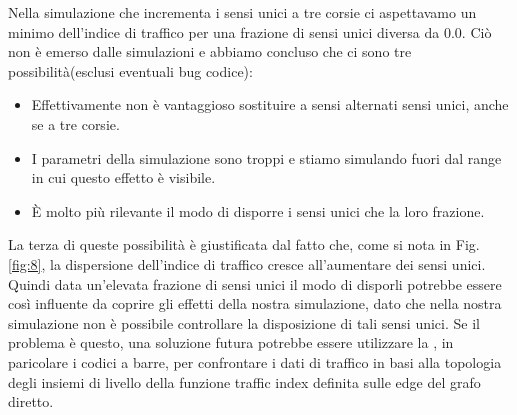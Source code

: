 \documentclass[main.tex]{subfiles}
\begin{document}
    Nella simulazione che incrementa i sensi unici a tre corsie ci aspettavamo un minimo dell'indice di traffico per una frazione di sensi unici diversa da 0.0.
    Ciò non è emerso dalle simulazioni e abbiamo concluso che ci sono tre possibilità(esclusi eventuali bug codice):
    \begin{itemize}
        \item Effettivamente non è vantaggioso sostituire a sensi alternati sensi unici, anche se a tre corsie.
        \item I parametri della simulazione sono troppi e stiamo simulando fuori dal range in cui questo effetto è visibile.
        \item \`{E} molto più rilevante il modo di disporre i sensi unici che la loro frazione.
    \end{itemize}

    La terza di queste possibilità è giustificata dal fatto che, come si nota in Fig. \ref{fig:8}, la dispersione dell'indice di traffico cresce all'aumentare dei
    sensi unici. Quindi data un'elevata frazione di sensi unici il modo di disporli potrebbe essere così influente da coprire gli effetti della nostra simulazione,
    dato che nella nostra simulazione non è possibile controllare la disposizione di tali sensi unici.
    Se il problema è questo, una soluzione futura potrebbe essere utilizzare la , in paricolare i codici a barre, 
    per confrontare i dati di traffico in basi alla topologia degli insiemi di livello della funzione traffic index definita sulle edge del grafo diretto.
\end{document}
